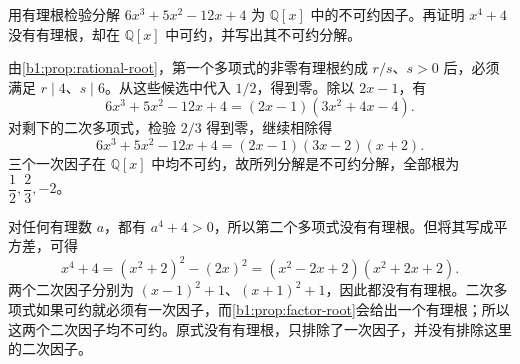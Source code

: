 \begin{exercise}\label{b1:ex:12-rational-root-limits}
	用有理根检验分解 \(6x^3+5x^2-12x+4\) 为 \(\mathbb Q[x]\) 中的不可约因子。再证明 \(x^4+4\) 没有有理根，却在 \(\mathbb Q[x]\) 中可约，并写出其不可约分解。
\end{exercise}
\begin{solution}
	由\cref{b1:prop:rational-root}，第一个多项式的非零有理根约成 \(r/s\)、\(s>0\) 后，必须满足 \(r\mid4\)、\(s\mid6\)。从这些候选中代入 \(1/2\)，得到零。除以 \(2x-1\)，有
	\[
		6x^3+5x^2-12x+4=(2x-1)(3x^2+4x-4).
	\]
	对剩下的二次多项式，检验 \(2/3\) 得到零，继续相除得
	\[
		6x^3+5x^2-12x+4=(2x-1)(3x-2)(x+2).
	\]
	三个一次因子在 \(\mathbb Q[x]\) 中均不可约，故所列分解是不可约分解，全部根为 \(\dfrac{1}{2},\dfrac{2}{3},-2\)。

	对任何有理数 \(a\)，都有 \(a^4+4>0\)，所以第二个多项式没有有理根。但将其写成平方差，可得
	\[
		x^4+4=(x^2+2)^2-(2x)^2 =(x^2-2x+2)(x^2+2x+2).
	\]
	两个二次因子分别为 \((x-1)^2+1\)、\((x+1)^2+1\)，因此都没有有理根。二次多项式如果可约就必须有一次因子，而\cref{b1:prop:factor-root}会给出一个有理根；所以这两个二次因子均不可约。原式没有有理根，只排除了一次因子，并没有排除这里的二次因子。
\end{solution}

